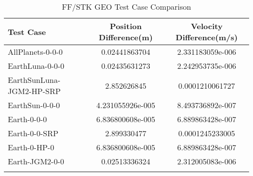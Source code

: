 \begin{table}[htbp!]
\centering
\caption{ FF/STK GEO Test Case Comparison}
      \begin{tabular}{lcc}
      \hline\hline
          Test Case & Position Difference(m) & Velocity Difference(m/s) \\
         \hline
         AllPlanets-0-0-0 & 0.02441863704 & 2.331183059e-006 \\
         EarthLuna-0-0-0 & 0.02435631273 & 2.242953735e-006 \\
         EarthSunLuna-JGM2-HP-SRP & 2.852626845 & 0.0001210061727 \\
         EarthSun-0-0-0 & 4.231055926e-005 & 8.493736892e-007 \\
         Earth-0-0-0 & 6.836800608e-005 & 6.889863428e-007 \\
         Earth-0-0-SRP & 2.899330477 & 0.0001245233005 \\
         Earth-0-HP-0 & 6.836800608e-005 & 6.889863428e-007 \\
         Earth-JGM2-0-0 & 0.02513336324 & 2.312005083e-006 \\
      \hline\hline
      \label{Table: GEO FF-STK Table} 
\end{tabular}
\end{table}
